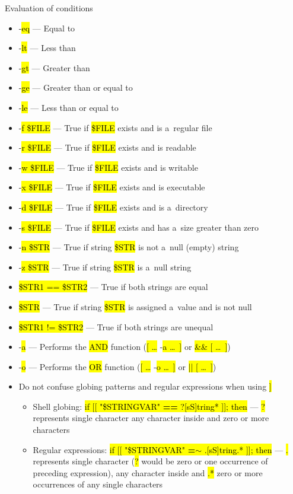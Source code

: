 \documentclass[compress, ucs, xelatex, 11pt, xcolor=svgnames, aspectratio=169,
	hyperref={
		bookmarks=true,
		unicode=true,
		colorlinks=true,
		pdftitle={Linux, command line and MetaCentrum},
		plainpages=false,
		pdfauthor={Vojtech Zeisek},
		pdfsubject={Course about use of Linux command line, writing shell scripts and using MetaCentrum of CESNET},
		pdfcreator={XeLaTeX},
		pdfkeywords={Linux, GNU, BASH, shell, command line, MetaCentrum},
		linkcolor=DarkRed, %
		anchorcolor=DarkBlue, %
		citecolor=Indigo, %
		filecolor=NavyBlue, %
		menucolor=DarkMagenta, %
		urlcolor=DarkBlue, %
		pdftex},
	url={hyphens, lowtilde} %
	]{beamer}
\renewcommand{\texttt}[1]{\hl{\ttfamily #1}}
\begin{document}
\begin{frame}[allowframebreaks]{Evaluation of conditions}
\begin{itemize}
\begin{itemize}
\begin{itemize}
			\end{itemize}
		\end{itemize}
		\item -\texttt{eq} --- Equal to
		\item -\texttt{lt} --- Less than
		\item -\texttt{gt} --- Greater than
		\item -\texttt{ge} --- Greater than or equal to
		\item -\texttt{le} --- Less than or equal to
		\item -\texttt{f \$FILE} --- True if \texttt{\$FILE} exists and is a~regular file
		\item -\texttt{r \$FILE} --- True if \texttt{\$FILE} exists and is readable
		\item -\texttt{w \$FILE} --- True if \texttt{\$FILE} exists and is writable
		\item -\texttt{x \$FILE} --- True if \texttt{\$FILE} exists and is executable
		\item -\texttt{d \$FILE} --- True if \texttt{\$FILE} exists and is a~directory
		\item -\texttt{s \$FILE} --- True if \texttt{\$FILE} exists and has a~size greater than zero
		\item -\texttt{n \$STR} --- True if string \texttt{\$STR} is not a~null (empty) string
		\item -\texttt{z \$STR} --- True if string \texttt{\$STR} is a~null string
		\item \texttt{\$STR1 == \$STR2} --- True if both strings are equal
		\item \texttt{\$STR} --- True if string \texttt{\$STR} is assigned a~value and is not null
		\item \texttt{\$STR1 != \$STR2} --- True if both strings are unequal
		\item -\texttt{a} --- Performs the \texttt{AND} function (\texttt{[ \ldots} -\texttt{a \ldots~]} or \texttt{[ \ldots~] \&\& [ \ldots~]})
		\item -\texttt{o} --- Performs the \texttt{OR} function (\texttt{[ \ldots} -\texttt{o \ldots~]} or \texttt{[ \ldots~] || [ \ldots~]})
		\item Do not confuse globing patterns and regular expressions when using \texttt{[[ \ldots~]]}
		\begin{itemize}
			\item Shell globing: \texttt{if [[ "\$STRINGVAR" \textbf{==} ?[sS]tring* ]]; then} --- \texttt{?} represents single character \texttt{[]} any character inside and \texttt{*} zero or more characters
			\item Regular expressions: \texttt{if [[ "\$STRINGVAR" \textbf{=$\sim$} .[sS]tring.* ]]; then} --- \texttt{.} represents single character (\texttt{?} would be zero or one occurrence of preceding expression), \texttt{[]} any character inside and \texttt{.*} zero or more occurrences of any single characters
		\end{itemize}
	\end{itemize}
\end{frame}
\end{document}
